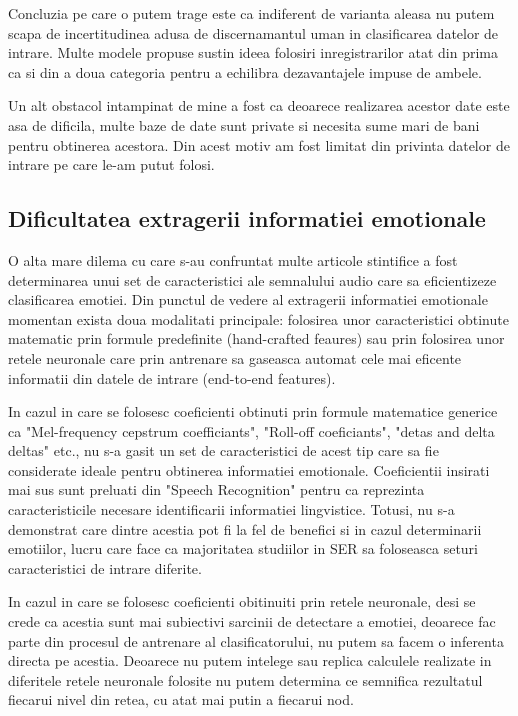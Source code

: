 \documentclass[a4paper,12pt, twoside]{book}
\begin{document}
					Concluzia pe care o putem trage este ca indiferent de varianta aleasa nu putem scapa de incertitudinea adusa de discernamantul uman in clasificarea datelor de intrare. Multe modele propuse sustin ideea folosiri inregistrarilor atat din prima ca si din a doua categoria pentru a echilibra dezavantajele impuse de ambele. \par
					Un alt obstacol intampinat de mine a fost ca deoarece realizarea acestor date este asa de dificila, multe baze de date sunt private si necesita sume mari de bani pentru obtinerea acestora. Din acest motiv am fost limitat din privinta datelor de intrare pe care le-am putut folosi.
				
				\subsection{Dificultatea extragerii informatiei emotionale}
					O alta mare dilema cu care s-au confruntat multe articole stintifice a fost determinarea unui set de caracteristici ale semnalului audio care sa eficientizeze clasificarea emotiei. Din punctul de vedere al extragerii informatiei emotionale momentan exista doua modalitati principale: folosirea unor caracteristici obtinute matematic prin formule predefinite (hand-crafted feaures) sau prin folosirea unor retele neuronale care prin antrenare sa gaseasca automat cele mai eficente informatii din datele de intrare (end-to-end features). \par
					In cazul in care se folosesc coeficienti obtinuti prin formule matematice generice ca "Mel-frequency cepstrum coefficiants", "Roll-off coeficiants", "detas and delta deltas" etc., nu s-a gasit un set de caracteristici de acest tip care sa fie considerate ideale pentru obtinerea informatiei emotionale. Coeficientii insirati mai sus sunt preluati din "Speech Recognition" pentru ca reprezinta caracteristicile necesare identificarii informatiei lingvistice. Totusi, nu s-a demonstrat care dintre acestia pot fi la fel de benefici si in cazul determinarii emotiilor, lucru care face ca majoritatea studiilor in SER sa foloseasca seturi caracteristici de intrare diferite. \par
					In cazul in care se folosesc coeficienti obitinuiti prin retele neuronale, desi se crede ca acestia sunt mai subiectivi sarcinii de detectare a emotiei, deoarece fac parte din procesul de antrenare al clasificatorului, nu putem sa facem o inferenta directa pe acestia. Deoarece nu putem intelege sau replica calculele realizate in diferitele retele neuronale folosite nu putem determina ce semnifica rezultatul fiecarui nivel din retea, cu atat mai putin a fiecarui nod. \par
\end{document}
